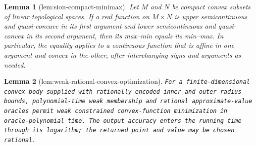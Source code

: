 \documentclass{article}
\newtheorem{lemma}{Lemma}
\begin{document}
\begin{lemma}[lem:sion-compact-minimax]\label{lem:sion-compact-minimax}
Let \(M\) and \(N\) be compact convex subsets of linear topological spaces.  If a real function on \(M\times N\) is upper semicontinuous and quasi-concave in its first argument and lower semicontinuous and quasi-convex in its second argument, then its max--min equals its min--max.  In particular, the equality applies to a continuous function that is affine in one argument and convex in the other, after interchanging signs and arguments as needed.
\end{lemma}

\begin{lemma}[lem:weak-rational-convex-optimization]\label{lem:weak-rational-convex-optimization}
\texttt{For a finite-\allowbreak{}dimensional convex body supplied with rationally encoded inner and outer radius bounds,\allowbreak{} polynomial-\allowbreak{}time weak membership and rational approximate-\allowbreak{}value oracles permit weak constrained convex-\allowbreak{}function minimization in oracle-\allowbreak{}polynomial time.  The output accuracy enters the running time through its logarithm;\allowbreak{} the returned point and value may be chosen rational.}
\end{lemma}
\end{document}
